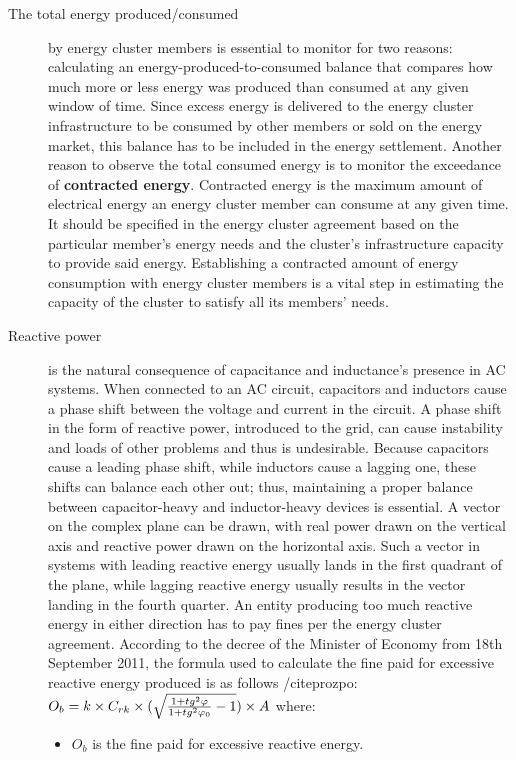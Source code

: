 \begin{description}
  \item[The total energy produced/consumed] by energy cluster members is essential to monitor for two reasons: calculating an energy-produced-to-consumed balance that compares how much more or less energy was produced than consumed at any given window of time. Since excess energy is delivered to the energy cluster infrastructure to be consumed by other members or sold on the energy market, this balance has to be included in the energy settlement. Another reason to observe the total consumed energy is to monitor the exceedance of \textbf{contracted energy}. Contracted energy is the maximum amount of electrical energy an energy cluster member can consume at any given time. It should be specified in the energy cluster agreement based on the particular member's energy needs and the cluster's infrastructure capacity to provide said energy. Establishing a contracted amount of energy consumption with energy cluster members is a vital step in estimating the capacity of the cluster to satisfy all its members' needs. 
  \item[Reactive power] is the natural consequence of capacitance and inductance's presence in AC systems. When connected to an AC circuit, capacitors and inductors cause a phase shift between the voltage and current in the circuit. A phase shift in the form of reactive power, introduced to the grid, can cause instability and loads of other problems and thus is undesirable. Because capacitors cause a leading phase shift, while inductors cause a lagging one, these shifts can balance each other out; thus, maintaining a proper balance between capacitor-heavy and inductor-heavy devices is essential. A vector on the complex plane can be drawn, with real power drawn on the vertical axis and reactive power drawn on the horizontal axis. Such a vector in systems with leading reactive energy usually lands in the first quadrant of the plane, while lagging reactive energy usually results in the vector landing in the fourth quarter. An entity producing too much reactive energy in either direction has to pay fines per the energy cluster agreement. According to the decree of the Minister of Economy from 18th September 2011, the formula used to calculate the fine paid for excessive reactive energy produced is as follows /citep{rozpo}: $O_{b} = k \times C_{rk} \times (\sqrt{{{1 + tg^2 \varphi} \over {1 + tg^2 \varphi_{0}}} - 1}) \times A$ where:
\begin{itemize}
  \item $O_{b}$ is the fine paid for excessive reactive energy.

\end{itemize}
\end{description}
